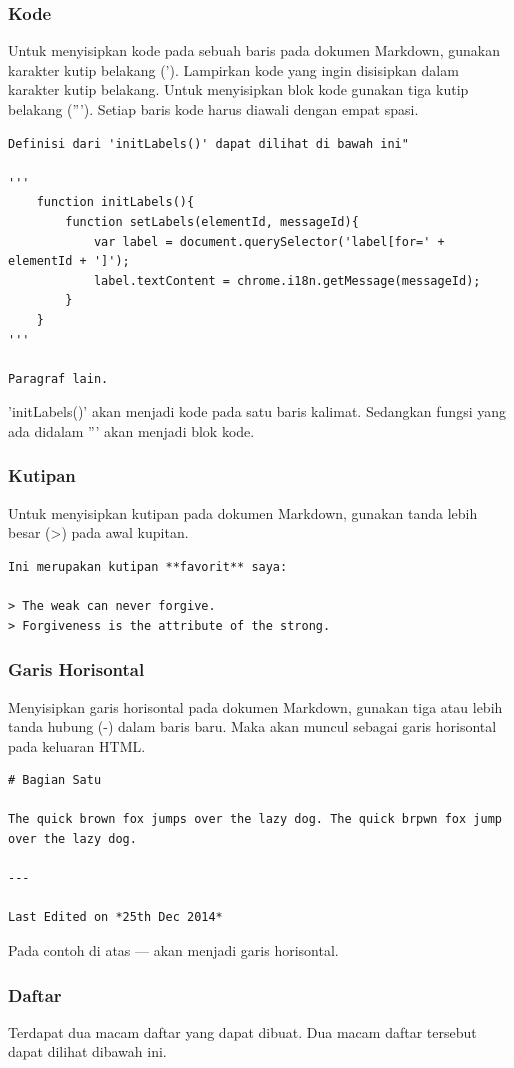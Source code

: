 \subsubsection{Kode}
Untuk menyisipkan kode pada sebuah baris pada dokumen Markdown, gunakan karakter kutip belakang ('). Lampirkan kode yang ingin disisipkan dalam karakter kutip belakang. Untuk menyisipkan blok kode gunakan tiga kutip belakang ('''). Setiap baris kode harus diawali dengan empat spasi.
\begin{lstlisting}
Definisi dari 'initLabels()' dapat dilihat di bawah ini"

'''
    function initLabels(){
        function setLabels(elementId, messageId){
            var label = document.querySelector('label[for=' + elementId + ']');
            label.textContent = chrome.i18n.getMessage(messageId);
        }
    }
'''

Paragraf lain.
\end{lstlisting}
'initLabels()' akan menjadi kode pada satu baris kalimat. Sedangkan fungsi yang ada didalam ''' akan menjadi blok kode.

\subsubsection{Kutipan}
Untuk menyisipkan kutipan pada dokumen Markdown, gunakan tanda lebih besar (>) pada awal kupitan.
\begin{lstlisting}
Ini merupakan kutipan **favorit** saya:

> The weak can never forgive.
> Forgiveness is the attribute of the strong.
\end{lstlisting}

\subsubsection{Garis Horisontal}
Menyisipkan garis horisontal pada dokumen Markdown, gunakan tiga atau lebih tanda hubung (-) dalam baris baru. Maka akan muncul sebagai garis horisontal pada keluaran HTML.
\begin{lstlisting}
# Bagian Satu

The quick brown fox jumps over the lazy dog. The quick brpwn fox jump over the lazy dog.

---

Last Edited on *25th Dec 2014*
\end{lstlisting}
Pada contoh di atas --- akan menjadi garis horisontal.

\subsubsection{Daftar}
Terdapat dua macam daftar yang dapat dibuat. Dua macam daftar tersebut dapat dilihat dibawah ini.


